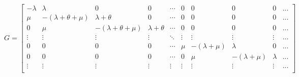 \documentclass[12pt]{article}
\begin{document}
	\begin{center}
		$
		G = \left[\begin{array}{cccccccccc}
		-\lambda & \lambda               & 0                      & 0                & \cdots  & 0      & 0              & 0               & 0       & ... \\
		\mu      & -(\lambda+\theta+\mu) & \lambda+\theta         & 0                & \cdots  & 0      & 0              & 0               & 0       & ... \\
		0        &\mu                    &  -(\lambda+\theta+\mu) & \lambda+\theta   & \cdots  & 0      & 0              & 0               & 0       & ... \\
		\vdots   & \vdots                & \vdots                 & \vdots           & \ddots  & \vdots & \vdots         & \vdots          & \vdots  & ... \\
		0        & 0                     & 0                      & 0                & \cdots  & \mu    & -(\lambda+\mu) & \lambda         & 0       & ... \\
		0        & 0                     & 0                      & 0                & \cdots  & 0      &\mu             &  -(\lambda+\mu) & \lambda & ... \\
		\vdots        & \vdots                      & \vdots                       & \vdots                & \vdots   & \vdots       &\vdots              &  \vdots  & \vdots  & ... \\
		\end{array}\right]
		$
	\end{center}
	
	  
\end{document}
